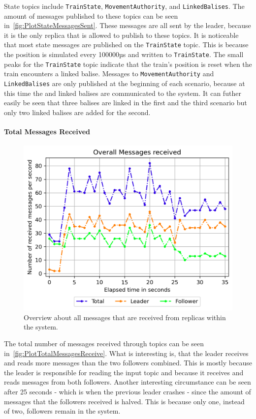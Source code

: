 State topics include \texttt{TrainState}, \texttt{MovementAuthority}, and \texttt{LinkedBalises}.
The amount of messages published to these topics can be seen in~\autoref{fig:PlotStateMessagesSent}.
These messages are all sent by the leader, because it is the only replica that is allowed to publish to these topics.
It is noticeable that most state messages are published on the \texttt{TrainState} topic.
This is because the position is simulated every 100000µs and written to \texttt{TrainState}.
The small peaks for the \texttt{TrainState} topic indicate that the train's position is reset when the train encounters a linked balise.
Messages to \texttt{MovementAuthority} and \texttt{LinkedBalises} are only published at the beginning of each scenario, because at this time the  and linked balises are communicated to the system.
It can futher easily be seen that three balises are linked in the first and the third scenario but only two linked balises are added for the second.

\paragraph{Total Messages Received}

\begin{figure}[!hb]
	\centering
	\includegraphics[width=0.75\linewidth]{images/plots/TotalMessagesReceive}
	\caption{Overview about all messages that are received from replicas within the system.}
	\label{fig:PlotTotalMessagesReceive}
\end{figure}

The total number of messages received through  topics can be seen in~\autoref{fig:PlotTotalMessagesReceive}.
What is interesting is, that the leader receives and reads more messages than the two followers combined.
This is mostly because the leader is responsible for reading the input topic and because it receives and reads messages from both followers.
Another interesting circumstance can be seen after 25 seconds - which is when the previous leader crashes - since the amount of messages that the followers received is halved.
This is because only one, instead of two, followers remain in the system.

